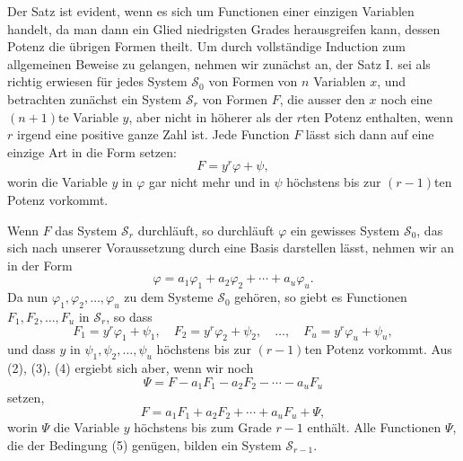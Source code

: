 \documentclass[11pt]{article}
\begin{document}
Der Satz ist evident, wenn es sich um Functionen einer einzigen Variablen handelt, da man dann ein Glied niedrigsten Grades herausgreifen kann, dessen Potenz die übrigen Formen theilt. Um durch vollständige Induction zum allgemeinen Beweise zu gelangen, nehmen wir zunächst an, der Satz I. sei als richtig erwiesen für jedes System $\mathcal S_0$ von Formen von $n$ Variablen $x$, und betrachten zunächst ein System $\mathcal S_r$ von Formen $F$, die ausser den $x$ noch eine $(n+1)$te Variable $y$, aber nicht in höherer als der $r$ten Potenz enthalten, wenn $r$ irgend eine positive ganze Zahl ist. Jede Function $F$ lässt sich dann auf eine einzige Art in die Form setzen:
\begin{equation}
F=y^r\varphi+\psi,
\tag{2}
\end{equation}
worin die Variable $y$ in $\varphi$ gar nicht mehr und in $\psi$ höchstens bis zur $(r-1)$ten Potenz vorkommt.

Wenn $F$ das System $\mathcal S_r$ durchläuft, so durchläuft $\varphi$ ein gewisses System $\mathcal S_0$, das sich nach unserer Voraussetzung durch eine Basis darstellen lässt, nehmen wir an in der Form
\begin{equation}
\varphi=a_1\varphi_1+a_2\varphi_2+\cdots+a_u\varphi_u.
\tag{3}
\end{equation}
Da nun $\varphi_1,\varphi_2,\ldots,\varphi_u$ zu dem Systeme $\mathcal S_0$ gehören, so giebt es Functionen $F_1,F_2,\ldots,F_u$ in $\mathcal S_r$, so dass
\begin{equation}
F_1=y^r\varphi_1+\psi_1,\quad
F_2=y^r\varphi_2+\psi_2,
\quad\ldots,\quad
F_u=y^r\varphi_u+\psi_u,
\tag{4}
\end{equation}
und dass $y$ in $\psi_1,\psi_2,\ldots,\psi_u$ höchstens bis zur $(r-1)$ten Potenz vorkommt. Aus (2), (3), (4) ergiebt sich aber, wenn wir noch
\[
\Psi=F-a_1F_1-a_2F_2-\cdots-a_uF_u
\]
setzen,
\begin{equation}
F=a_1F_1+a_2F_2+\cdots+a_uF_u+\Psi,
\tag{5}
\end{equation}
worin $\Psi$ die Variable $y$ höchstens bis zum Grade $r-1$ enthält. Alle Functionen $\Psi$, die der Bedingung (5) genügen, bilden ein System $\mathcal S_{r-1}$.
\end{document}
